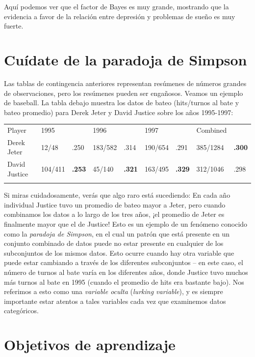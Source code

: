 \documentclass[
  12pt,
]{book}
\begin{document}
Aquí podemos ver que el factor de Bayes es muy grande, mostrando que la evidencia a favor de la relación entre depresión y problemas de sueño es muy fuerte.

\hypertarget{cuuxeddate-de-la-paradoja-de-simpson}{%
\section{Cuídate de la paradoja de Simpson}\label{cuuxeddate-de-la-paradoja-de-simpson}}

Las tablas de contingencia anteriores representan resúmenes de números grandes de observaciones, pero los resúmenes pueden ser engañosos. Veamos un ejemplo de baseball. La tabla debajo muestra los datos de bateo (hits/turnos al bate y bateo promedio) para Derek Jeter y David Justice sobre los años 1995-1997:

\begin{longtable}[]{@{}lllllllll@{}}
\toprule
Player & 1995 & & 1996 & & 1997 & & Combined & \\ \addlinespace
\midrule
\endhead
Derek Jeter & 12/48 & .250 & 183/582 & .314 & 190/654 & .291 & 385/1284 & \textbf{.300} \\ \addlinespace
David Justice & 104/411 & \textbf{.253} & 45/140 & \textbf{.321} & 163/495 & \textbf{.329} & 312/1046 & .298 \\ \addlinespace
\bottomrule
\end{longtable}

Si miras cuidadosamente, verás que algo raro está sucediendo: En cada año individual Justice tuvo un promedio de bateo mayor a Jeter, pero cuando combinamos los datos a lo largo de los tres años, ¡el promedio de Jeter es finalmente mayor que el de Justice! Esto es un ejemplo de un fenómeno conocido como la \emph{paradoja de Simpson}, en el cual un patrón que está presente en un conjunto combinado de datos puede no estar presente en cualquier de los subconjuntos de los mismos datos. Esto ocurre cuando hay otra variable que puede estar cambiando a través de los diferentes subconjuntos -- en este caso, el número de turnos al bate varía en los diferentes años, donde Justice tuvo muchos más turnos al bate en 1995 (cuando el promedio de hits era bastante bajo). Nos referimos a esto como una \emph{variable oculta} (\emph{lurking variable}), y es siempre importante estar atentos a tales variables cada vez que examinemos datos categóricos.

\hypertarget{objetivos-de-aprendizaje}{%
\section{Objetivos de aprendizaje}\label{objetivos-de-aprendizaje}}
\end{document}
